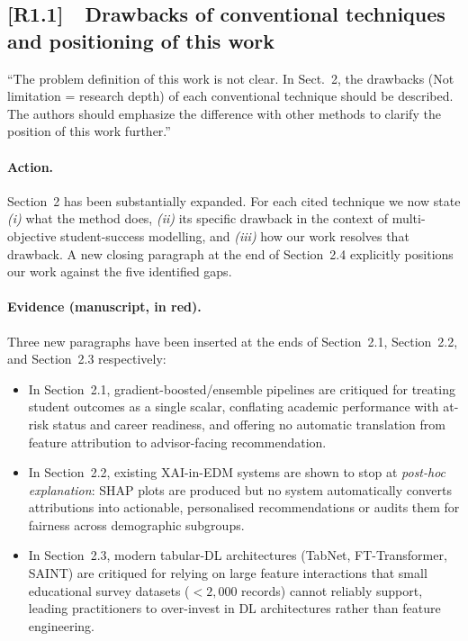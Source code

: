 \documentclass[11pt,a4paper]{article}
\newcommand{\cid}[1]{\textcolor{revred}{\textbf{[#1]}}}
\newcommand{\sectref}[1]{Section~#1}
\begin{document}
\subsection*{\cid{R1.1}~~Drawbacks of conventional techniques and positioning of this work}

\begin{reviewerquote}
``The problem definition of this work is not clear. In Sect.~2, the drawbacks (Not limitation = research depth) of each conventional technique should be described. The authors should emphasize the difference with other methods to clarify the position of this work further.''
\end{reviewerquote}

\paragraph{Action.} \sectref{2} has been substantially expanded. For each cited technique we now state \emph{(i)} what the method does, \emph{(ii)} its specific drawback in the context of multi-objective student-success modelling, and \emph{(iii)} how our work resolves that drawback. A new closing paragraph at the end of \sectref{2.4} explicitly positions our work against the five identified gaps.

\paragraph{Evidence (manuscript, in red).} Three new paragraphs have been inserted at the ends of \sectref{2.1}, \sectref{2.2}, and \sectref{2.3} respectively:

\begin{itemize}
  \item In \sectref{2.1}, gradient-boosted/ensemble pipelines are critiqued for treating student outcomes as a single scalar, conflating academic performance with at-risk status and career readiness, and offering no automatic translation from feature attribution to advisor-facing recommendation.
  \item In \sectref{2.2}, existing XAI-in-EDM systems are shown to stop at \emph{post-hoc explanation}: SHAP plots are produced but no system automatically converts attributions into actionable, personalised recommendations or audits them for fairness across demographic subgroups.
  \item In \sectref{2.3}, modern tabular-DL architectures (TabNet, FT-Transformer, SAINT) are critiqued for relying on large feature interactions that small educational survey datasets ($<\!2{,}000$ records) cannot reliably support, leading practitioners to over-invest in DL architectures rather than feature engineering.
\end{itemize}
\end{document}

